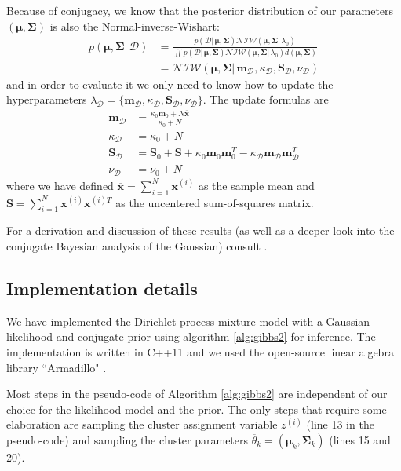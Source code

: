 \documentclass[final,3p,times,twocolumn]{elsarticle}
\let\bs\boldsymbol
\begin{document}
Because of conjugacy, we know that the posterior distribution of our parameters $(\bs\mu,\bs\Sigma)$ is also the Normal-inverse-Wishart:
\begin{equation}
\label{eqn:NIWpost}
\begin{split}
p(\bs\mu,\bs\Sigma|\,\mathcal{D}) &= \frac{p(\mathcal{D}|\,\bs\mu,\bs\Sigma)\mathcal{NIW}(\bs\mu,\bs\Sigma|\,\lambda_0)}{\iint p(\mathcal{D}|\,\bs\mu,\bs\Sigma)\mathcal{NIW}(\bs\mu,\bs\Sigma|\,\lambda_0)d(\bs\mu,\bs\Sigma)}\\
&= \mathcal{NIW}(\bs\mu,\bs\Sigma|\,\bs m_\mathcal{D},\kappa_\mathcal{D},\bs S_\mathcal{D},\nu_\mathcal{D})
\end{split}
\end{equation}
and in order to evaluate it we only need to know how to update the hyperparameters $\lambda_\mathcal{D} = \{\bs m_\mathcal{D},\kappa_\mathcal{D},\bs S_\mathcal{D},\nu_\mathcal{D}\}$.
The update formulas are
\begin{equation*}
\begin{split}
\bs m_\mathcal{D} &= \frac{\kappa_0\bs m_0 + N \overline{\bs x}}{\kappa_0 + N}\\
\kappa_\mathcal{D} &= \kappa_0 + N\\
\bs S_\mathcal{D} &= \bs S_0 + \bs S + \kappa_0 \bs m_0 \bs m_0^T - \kappa_\mathcal{D} \bs m_\mathcal{D} \bs m_\mathcal{D}^T\\
\nu_\mathcal{D} &= \nu_0 + N
\end{split}
\end{equation*}
where we have defined $\overline{\bs x} = \sum_{i=1}^N \bs x^{(i)}$ as the sample mean and $\bs S = \sum_{i=1}^N \bs x^{(i)} \bs x^{(i)T}$ as the uncentered sum-of-squares matrix.

For a derivation and discussion of these results (as well as a deeper look into the conjugate Bayesian analysis of the Gaussian) consult \cite{murphy2007}.

\subsection{Implementation details}
We have implemented the Dirichlet process mixture model with a Gaussian likelihood and conjugate prior using algorithm \ref{alg:gibbs2} for inference.
The implementation is written in C++11 and we used the open-source linear algebra library ``Armadillo" \cite{armadillo}.

Most steps in the pseudo-code of Algorithm \ref{alg:gibbs2} are independent of our choice for the likelihood model and the prior. 
The only steps that require some elaboration are sampling the cluster assignment variable $z^{(i)}$ (line 13 in the pseudo-code) and sampling the cluster parameters $\overline\theta_k = \left(\bs\mu_k,\bs\Sigma_k\right)$ (lines 15 and 20).
\end{document}
